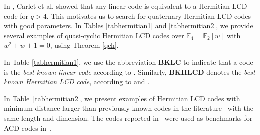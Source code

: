 \documentclass[a4paper,12pt]{article}
\begin{document}
In \cite{carlet2018}, Carlet et al. showed that any linear code is equivalent to a Hermitian LCD code for $q > 4$. This motivates us to search for quaternary Hermitian LCD codes with good parameters.  
In Tables \ref{tabhermitian1} and \ref{tabhermitian2}, we provide several examples of  quasi-cyclic Hermitian LCD codes over $\mathbb{F}_4=\mathbb{F}_2[w]$ with $w^2+w+1=0$, using Theorem \ref{qch}. 

In Table \ref{tabhermitian1}, we use the abbreviation \textbf{BKLC} to indicate that a code is the \emph{best known linear code} according to \cite{grassltable}. Similarly, \textbf{BKHLCD} denotes the \emph{best known Hermitian LCD code}, according to \cite{araya2024} and \cite{sok2020}.

In Table~\ref{tabhermitian2}, we present examples of Hermitian LCD codes with minimum distance larger than previously known codes in the literature~\cite{crnkovic2023, grbac} with the same length and dimension. The codes reported in~\cite{crnkovic2023, grbac} were used as benchmarks for ACD codes in~\cite{zhu2024}.
\end{document}

